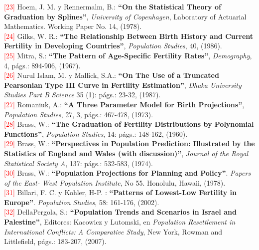 \noindent \textcolor{red}{[23]} Hoem, J. M. y Rennermalm, B.: \textbf{``On the Statistical Theory of Graduation by Splines''}, \textit{University of Copenhagen}, Laboratory of Actuarial Mathematics. Working Paper No. 14, (1978).\\

\noindent \textcolor{red}{[24]} Gilks, W. R.: \textbf{``The Relationship Between Birth History and Current Fertility in Developing Countries''}, \textit{Population Studies}, 40, (1986).\\

\noindent \textcolor{red}{[25]} Mitra, S.: \textbf{“The Pattern of Age-Specific Fertility Rates”}, \textit{Demography}, 4, págs.: 894-906, (1967).\\

\noindent \textcolor{red}{[26]} Nurul Islam, M. y Mallick, S.A.: \textbf{``On The Use of a Truncated Pearsonian Type III Curve in Fertility Estimation''}, \textit{Dhaka University Studies Part B Science} 35 (1): págs.: 23-32, (1987).\\

\noindent \textcolor{red}{[27]} Romaniuk, A.: \textbf{“A Three Parameter Model for Birth Projections”}, \textit{Population Studies}, 27, 3, págs.: 467-478, (1973).\\

\noindent \textcolor{red}{[28]} Brass, W.: \textbf{``The Graduation of Fertility Distributions by Polynomial Functions”}, \textit{Population Studies}, 14: págs.: 148-162, (1960).\\

\noindent \textcolor{red}{[29]} Brass, W.: \textbf{``Perspectives in Population Prediction: Illustrated by the Statistics of England and Wales (with discussion)”}, \textit{Journal of the Royal Statistical Society A}, 137: págs.: 532-583, (1974).\\

\noindent \textcolor{red}{[30]} Brass, W.: \textbf{``Population Projections for Planning and Policy''}. \textit{Papers of the East- West Population Institute}, No 55. Honolulu, Hawaii, (1978).\\ 

\noindent \textcolor{red}{[31]} Billari, F. C. y Kohler, H-P. : \textbf{``Patterns of Lowest-Low Fertility in Europe''}. \textit{Population Studies}, 58: 161-176, (2002).\\ 

\noindent \textcolor{red}{[32]} DellaPergola, S.: \textbf{``Population Trends and Scenarios in Israel and Palestine''}, Editores: Kacowicz y Lutomski, en \textit{Population Resettlement in International Conflicts: A Comparative Study}, New York, Rowman and Littlefield, págs.: 183-207, (2007).\\ 


